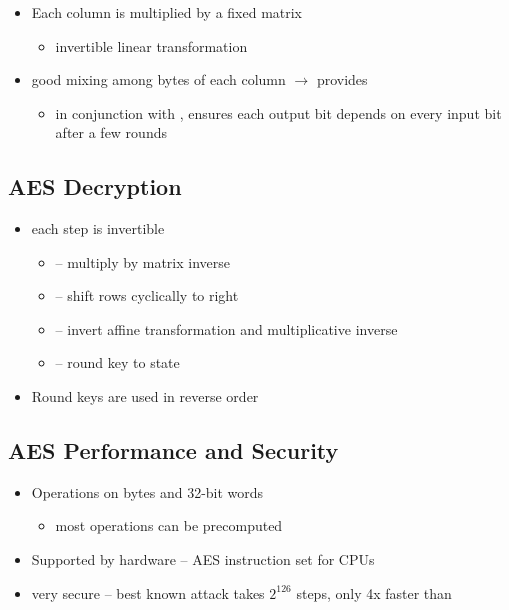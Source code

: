 \documentclass[draft]{article}
\begin{document}
\subsubsection*{}
\begin{itemize}[nosep]
    \item Each column is multiplied by a fixed matrix
          \begin{itemize}[nosep]
              \item invertible linear transformation
          \end{itemize}
    \item good mixing among bytes of each column $\rightarrow$ provides 
          \begin{itemize}[nosep]
              \item in conjunction with , ensures each output bit depends on every input bit after a few rounds
          \end{itemize}
\end{itemize}
\subsection{AES Decryption}
\begin{itemize}[nosep]
    \item each step is invertible
          \begin{itemize}[nosep]
              \item {} -- multiply by matrix inverse
              \item {} -- shift rows cyclically to right
              \item {} -- invert affine transformation and multiplicative inverse
              \item {} --  round key to state
          \end{itemize}
    \item Round keys are used in reverse order
\end{itemize}
\subsection{AES Performance and Security}
\begin{itemize}[nosep]
    \item Operations on bytes and 32-bit words
          \begin{itemize}[nosep]\item most operations can be precomputed\end{itemize}
    \item Supported by hardware -- AES instruction set for CPUs
    \item very secure -- best known attack takes $2^{126}$ steps, only 4x faster than 
\end{itemize}
\end{document}
